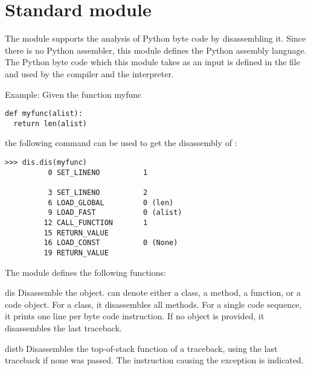 \section{Standard module }	%

\label{module-dis}

The  module supports the analysis of Python byte code by
disassembling it.  Since there is no Python assembler, this module
defines the Python assembly language.  The Python byte code which
this module takes as an input is defined in the file 
 and used by the compiler and the interpreter.

Example: Given the function myfunc

\bcode\begin{verbatim}
def myfunc(alist):
  return len(alist)
\end{verbatim}\ecode

the following command can be used to get the disassembly of :

\begin{verbatim}
>>> dis.dis(myfunc)
          0 SET_LINENO          1

          3 SET_LINENO          2
          6 LOAD_GLOBAL         0 (len)
          9 LOAD_FAST           0 (alist)
         12 CALL_FUNCTION       1
         15 RETURN_VALUE   
         16 LOAD_CONST          0 (None)
         19 RETURN_VALUE   
\end{verbatim}

The  module defines the following functions:

\renewcommand{\indexsubitem}{(in module dis)}

\begin{funcdesc}{dis}{}
Disassemble the  object.  can denote
either a class, a method, a function, or a code object.  For a class,
it disassembles all methods.  For a single code sequence, it prints
one line per byte code instruction.  If no object is provided, it
disassembles the last traceback.
\end{funcdesc}

\begin{funcdesc}{distb}{}
Disassembles the top-of-stack function of a traceback, using the last
traceback if none was passed.  The instruction causing the exception
is indicated.
\end{funcdesc}

